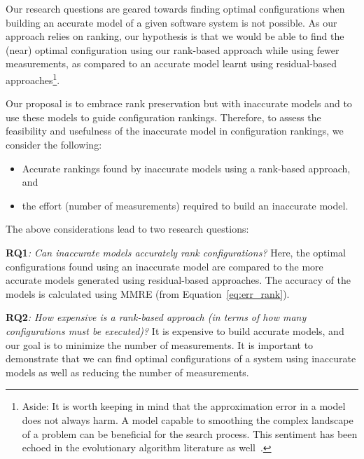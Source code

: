 Our research questions are geared towards finding optimal configurations when building an accurate model of a given software system is not possible. As our approach relies on ranking, our hypothesis is that we would be able to find the (near) optimal configuration  using our rank-based approach while using fewer measurements, as compared to an accurate model learnt using  residual-based approaches\footnote{Aside: It is worth keeping in mind that the approximation error in a model does not always harm. A model capable to smoothing the complex landscape of a problem can be beneficial for the search process. This sentiment has been echoed in the evolutionary algorithm literature as well~\cite{lim2010generalizing}.}.

Our proposal is to embrace rank preservation but with inaccurate models and to use these models to guide configuration rankings. Therefore, to assess the feasibility and usefulness of the inaccurate model in configuration rankings, we consider the following:
\begin{itemize}
    \item Accurate rankings found by inaccurate models using a rank-based approach, and
    \item the effort (number of measurements) required to build an inaccurate model. 
\end{itemize}
The above considerations lead to  two research questions:

 
  
 
\textbf{RQ1}\textit{: Can  inaccurate    models accurately rank
configurations?}
Here, the optimal configurations found using an inaccurate model are compared to the more accurate models generated using residual-based approaches. The accuracy of the models is calculated using MMRE (from Equation~\ref{eq:err_rank}). 


\textbf{RQ2}\textit{: How expensive is a rank-based approach (in terms of
 how many configurations must be executed)?}
It is expensive to build accurate models, and our goal is to minimize the number of measurements. It is important to demonstrate that we can find optimal configurations of a system using inaccurate models as well as reducing the number of measurements.

